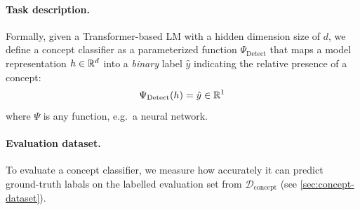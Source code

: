 \documentclass{article}
\theoremstyle{plain}
\theoremstyle{definition}
\theoremstyle{remark}
\renewcommand{\cite}{\citep}
\begin{document}
\paragraph{Task description.}
Formally, given a Transformer-based LM with a hidden dimension size of $d$, we define a concept classifier as a parameterized function $\Psi_{\text{Detect}}$ that maps a model representation $h \in \mathbb{R}^d$ into a \emph{binary} label $\hat{y}$ indicating the relative presence of a concept:
\begin{equation}
    \Psi_{\text{Detect}}(h) = \hat{y} \in \mathbb{R}^1 \label{eqn:concept-detection}
\end{equation}
where $\Psi$ is any function, e.g.~a neural network.



\paragraph{Evaluation dataset.} To evaluate a concept classifier, we
measure how accurately it can predict ground-truth labals on the labelled evaluation set from $\mathcal{D}_{\text{concept}}$ (see \cref{sec:concept-dataset}).
\end{document}

